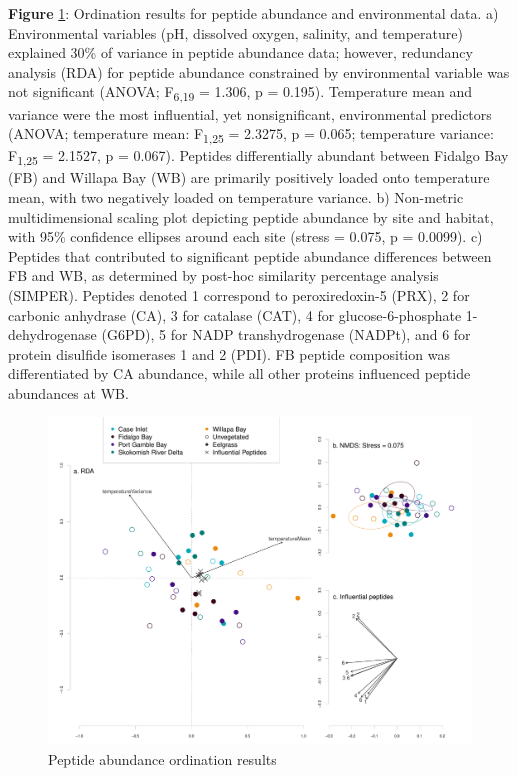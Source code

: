 \documentclass [11pt, proquest] {uwthesis}[2015/03/03]
\begin{document}
\textbf{Figure} \ref{fig:pepordination}: Ordination results for peptide abundance and environmental data. a) Environmental variables (pH, dissolved oxygen, salinity, and temperature) explained 30\% of variance in peptide abundance data; however, redundancy analysis (RDA) for peptide abundance constrained by environmental variable was not significant (ANOVA; F\textsubscript{6,19} = 1.306, p = 0.195). Temperature mean and variance were the most influential, yet nonsignificant, environmental predictors (ANOVA; temperature mean: F\textsubscript{1,25} = 2.3275, p = 0.065; temperature variance: F\textsubscript{1,25} = 2.1527, p = 0.067). Peptides differentially abundant between Fidalgo Bay (FB) and Willapa Bay (WB) are primarily positively loaded onto temperature mean, with two negatively loaded on temperature variance. b) Non-metric multidimensional scaling plot depicting peptide abundance by site and habitat, with 95\% confidence ellipses around each site (stress = 0.075, p = 0.0099). c) Peptides that contributed to significant peptide abundance differences between FB and WB, as determined by post-hoc similarity percentage analysis (SIMPER). Peptides denoted 1 correspond to peroxiredoxin-5 (PRX), 2 for carbonic anhydrase (CA), 3 for catalase (CAT), 4 for glucose-6-phosphate 1-dehydrogenase (G6PD), 5 for NADP transhydrogenase (NADPt), and 6 for protein disulfide isomerases 1 and 2 (PDI). FB peptide composition was differentiated by CA abundance, while all other proteins influenced peptide abundances at WB.\newline
\begin{figure}[h]
\centering
  \includegraphics[width=1\textwidth]{figure/Ch1/fig1.3.pdf}
  \caption{Peptide abundance ordination results}
  \label{fig:pepordination}
\end{figure}
\clearpage
\end{document}
